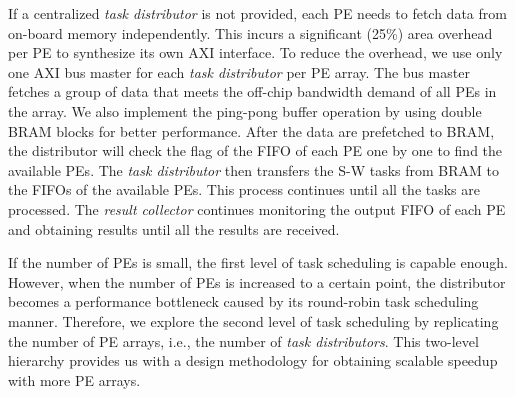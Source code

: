 If a centralized \textit{task distributor} is not provided, each PE needs to fetch data from on-board memory independently. 
This incurs a significant (25\%) area overhead per PE to synthesize its own AXI interface. 
To reduce the overhead, we use only one AXI bus master for each \textit{task distributor} per PE array. 
The bus master fetches a group of data that meets the off-chip bandwidth demand of all PEs in the array. 
We also implement the ping-pong buffer operation by using double BRAM blocks for better performance. 
After the data are prefetched to BRAM, 
the distributor will check the flag of the FIFO of each PE one by one to find the available PEs. 
The \textit{task distributor} then transfers the S-W tasks from BRAM to the FIFOs of the available PEs. 
This process continues until all the tasks are processed.
The \textit{result collector} continues monitoring the output FIFO of each PE and obtaining results until all the results are received.

If the number of PEs is small, the first level of task scheduling is capable enough. 
However, when the number of PEs is increased to a certain point, 
the distributor becomes a performance bottleneck caused by its round-robin task scheduling manner.
Therefore, we explore the second level of task scheduling by replicating the number of PE arrays, i.e., the number of \textit{task distributors}. 
This two-level hierarchy provides us with a design methodology for obtaining scalable speedup with more PE arrays.
